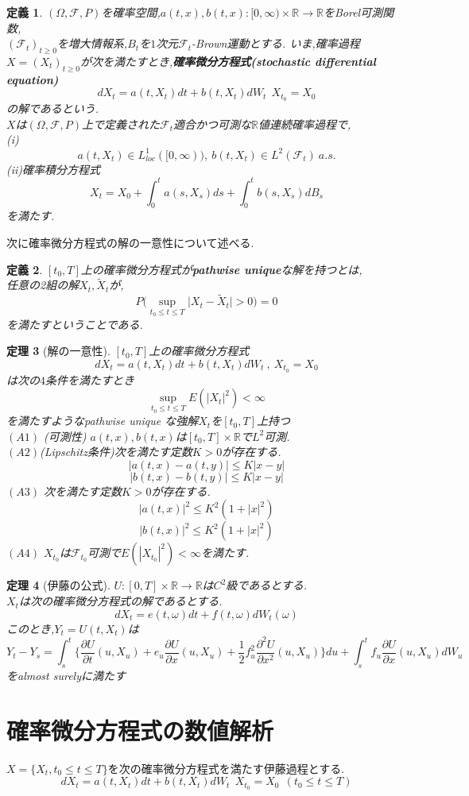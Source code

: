 \documentclass[a4paper,dvipdfmx]{jreport}
\numberwithin{equation}{section}
\newtheorem{Thm}     {定理}[section]
\newtheorem{Def}     [Thm]{定義}
\renewenvironment{leftbar}{%
  \def\FrameCommand{\vrule width 1pt \hspace{10pt}}%
  \MakeFramed {\advance\hsize-\width \FrameRestore}}%
 {\endMakeFramed}
\def\R{\mathbb R}
\def\F{\mathcal F}
\def\thm{\begin{leftbar}\begin{Thm}}
\def\thmx{\end{Thm}\end{leftbar}}
\def\defb{\begin{leftbar}\begin{Def}}
\def\defx{\end{Def}\end{leftbar}}
\def\eq{\begin{equation}}
\def\eqx{\end{equation}}
\begin{document}
\defb
$(\Omega,\F,P)$を確率空間,$a(t,x),b(t,x):[0,\infty) \times \R \to \R$をBorel可測関数,\\
$(\F_t)_{t\ge 0}$を増大情報系,$B_t$を$1$次元$\F_t$-Brown運動とする.
いま,確率過程$X = (X_t)_{t\ge 0}$が次を満たすとき,{\bf 確率微分方程式(stochastic differential equation)}
\eq
dX_t = a(t,X_t)dt + b(t,X_t)dW_t \ \ X_{t_0} =X_0
\eqx
の解であるという.\\
$X$は$(\Omega,\F,P)$上で定義された$\F_t$適合かつ可測な$\R$値連続確率過程で,\\
(i)
\[
  a(t,X_t) \in L^1_{loc} ([0,\infty)),\  b(t,X_t) \in L^2(\F_t)\  a.s.
\]
(ii)確率積分方程式
\[
X_t = X_0 + \int_0^t a(s,X_s)ds +  \int_0^t b(s,X_s)dB_s
\]
を満たす.
\defx
次に確率微分方程式の解の一意性について述べる.\\
\defb
$[t_0,T]$上の確率微分方程式が{\bf pathwise unique}な解を持つとは,\\
任意の2組の解$X_t,\tilde{X}_t$が,
\[
P \big( \sup_{t_0\le t\le T} \big| X_t - \tilde{X}_t \big | > 0 \big) = 0
\]
を満たすということである.
\defx


\thm[解の一意性]
\label{thm_uniq}
$[t_0,T]$上の確率微分方程式
\[
dX_t = a(t,X_t)dt + b(t,X_t)dW_t \ ,\ X_{t_0} =X_0
\]
は次の$4$条件を満たすとき
\[
\sup_{t_0\le t\le T} E(|X_t|^2) < \infty
\]
を満たすようなpathwise unique な強解$X_t$を$[t_0,T]$上持つ\\
$(A1)$ (可測性) $a(t,x),b(t,x)$は$[t_0,T] \times\R$で$L^2$可測.\\
$(A2)$(Lipschitz条件)次を満たす定数$K>0$が存在する.
\[
|a(t,x) - a(t,y) | \le K |x-y|
\]
\[
|b(t,x) - b(t,y) | \le K |x-y|
\]
$(A3)$ 次を満たす定数$K>0$が存在する.
\[
|a(t,x)|^2 \le K^2 (1+|x|^2)
\]
\[
|b(t,x)|^2 \le K^2 (1+|x|^2)
\]
$(A4)$
$X_{t_0}$は$\F_{t_0}$可測で$E(|X_{t_0}|^2)<\infty$を満たす.
\thmx

\thm[伊藤の公式]
$U:[0,T]\times\R \to \R$は$C^2$級であるとする.\\
$X_t$は次の確率微分方程式の解であるとする.
\[
dX_t = e(t,\omega)dt + f(t,\omega)dW_t(\omega)
\]
このとき,$Y_t=U(t,X_t)$は
\[
Y_t - Y_s = \int_s^t \{ \frac{\partial U}{\partial t}(u,X_u)
+ e_u\frac{\partial U}{\partial x}(u,X_u)
+ \frac{1}{2} f_u^2 \frac{\partial^2 U}{\partial x^2}(u,X_u)\} du
+ \int_s^t f_u \frac{\partial U}{\partial x}(u,X_u)dW_u
\]
をalmost surelyに満たす
\thmx

\section{確率微分方程式の数値解析}
$X = \{X_t , t_0 \le t \le T \}$を次の確率微分方程式を満たす伊藤過程とする.
\eq
\label{itoeq}
dX_t = a(t,X_t)dt + b(t,X_t)dW_t \ \ X_{t_0} =X_0 \  \  (t_0 \le t \le T)
\eqx
\end{document}
